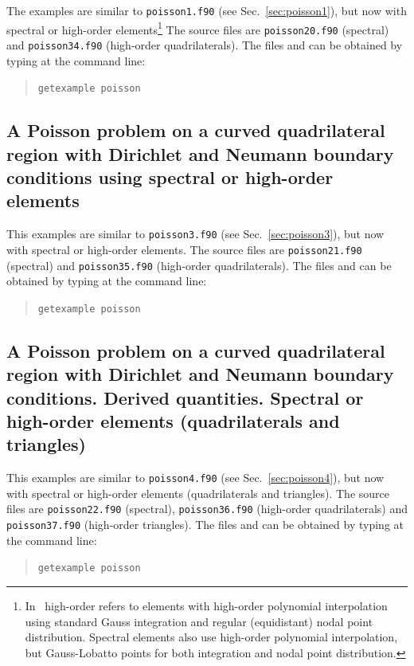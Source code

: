 The examples are similar to \texttt{poisson1.f90} (see
Sec.~\ref{sec:poisson1}), but now with spectral or high-order elements\footnote{In \tfem\ high-order refers to elements with high-order polynomial interpolation using standard Gauss integration and regular (equidistant) nodal point distribution. Spectral elements also use high-order polynomial interpolation, but Gauss-Lobatto points for both integration and nodal point distribution.}
The source files are \texttt{poisson20.f90} (spectral) and \texttt{poisson34.f90} (high-order quadrilaterals).
The files and can be obtained by typing at the
command line:
\begin{quote}
   \texttt{getexample poisson}
\end{quote}

\subsection{A Poisson problem on a curved quadrilateral region with Dirichlet 
            and Neumann boundary conditions using spectral or high-order elements} 
\label{sec:poisson21}

This examples are similar to \texttt{poisson3.f90} (see
Sec.~\ref{sec:poisson3}), but now with spectral or high-order elements.
The source files are \texttt{poisson21.f90} (spectral) and \texttt{poisson35.f90} (high-order quadrilaterals).
The files and can be obtained by typing at the
command line:
\begin{quote}
   \texttt{getexample poisson}
\end{quote}

\subsection{A Poisson problem on a curved quadrilateral region with Dirichlet 
            and Neumann boundary conditions. Derived quantities. Spectral or high-order
            elements (quadrilaterals and triangles)} 
\label{sec:poisson22}

This examples are similar to \texttt{poisson4.f90} (see
Sec.~\ref{sec:poisson4}), but now with spectral or high-order elements (quadrilaterals and triangles).
The source files are \texttt{poisson22.f90} (spectral), \texttt{poisson36.f90} (high-order quadrilaterals) and \texttt{poisson37.f90} (high-order triangles).
The files and can be obtained by typing at the
command line:
\begin{quote}
   \texttt{getexample poisson}
\end{quote}

